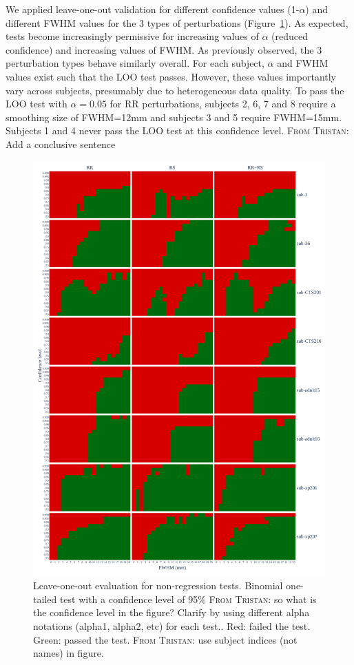 \documentclass{article}
\newcommand{\TG}[1]{\color{blue}\textsc{From Tristan:} #1\color{black}\xspace}
\begin{document}
We applied leave-one-out validation for different confidence values (1-$\alpha$) and different FWHM  values for the 3 types of perturbations (Figure~\ref{fig:loo_bonferroni}). As expected, tests become increasingly permissive for increasing values of $\alpha$ (reduced confidence) and increasing values of FWHM.
As previously observed, the 3 perturbation types behave similarly overall. For each subject, $\alpha$ and FWHM values exist such that the LOO test passes. However, these values importantly vary across subjects, presumably due to heterogeneous data quality. To pass the LOO test with $\alpha=0.05$ for RR perturbations, subjects 2, 6, 7 and 8 require a smoothing size of FWHM=12mm and subjects 3 and 5 require FWHM=15mm. Subjects 1 and 4 never pass the LOO test at this confidence level.
\TG{Add a conclusive sentence}

\begin{figure}
    \centering
    \includegraphics[width=\linewidth]{figures/exclude_mct_fwe_bonferroni.pdf}
    \caption{Leave-one-out evaluation for non-regression tests.
        Binomial one-tailed test with a confidence level of 95\% \TG{so what is the confidence level in the figure? Clarify by using different alpha notations (alpha1, alpha2, etc) for each test.}.
        Red: failed the test. Green: passed the test. \TG{use subject indices (not names) in figure.}}
    \label{fig:loo_bonferroni}
\end{figure}
\end{document}

